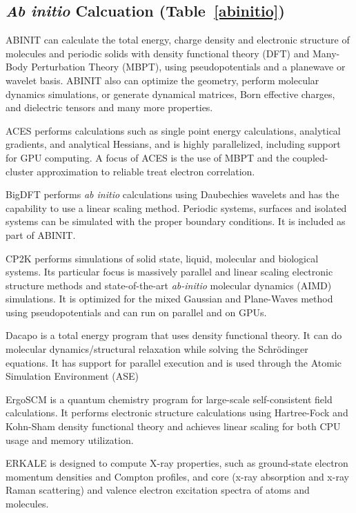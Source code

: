 \subsection*{\textit{Ab initio} Calcuation (Table~\ref{abinitio})}

ABINIT \cite{Gonze_2009} can calculate the total energy, charge density and electronic structure of molecules and periodic solids with density functional theory (DFT) and Many-Body Perturbation Theory (MBPT), using pseudopotentials and a planewave or wavelet basis. ABINIT also can optimize the geometry, perform molecular dynamics simulations, or generate dynamical matrices, Born effective charges, and dielectric tensors and many more properties. 

ACES \cite{Lotrich_2008} performs calculations such as single point energy calculations, analytical gradients, and analytical Hessians, and is highly parallelized, including support for GPU computing.
A focus of ACES is the use of MBPT and the coupled-cluster approximation to reliable treat electron correlation.

BigDFT \cite{Genovese_2008,Mohr_2014,Mohr_2015} performs \textit{ab initio} calculations using Daubechies wavelets and has the capability to use a linear scaling method.  Periodic systems, surfaces and isolated systems can be simulated with the proper boundary conditions. It is included as part of ABINIT.

CP2K \cite{Hutter_2013} performs simulations of solid state, liquid, molecular and biological systems. Its particular focus is massively parallel and linear scaling electronic structure methods and state-of-the-art \textit{ab-initio} molecular dynamics (AIMD) simulations. It is optimized for the mixed Gaussian and Plane-Waves method using pseudopotentials and can run on parallel and on GPUs.

Dacapo is a total energy program that uses density functional theory. It can do molecular dynamics/structural relaxation while solving the Schr\"odinger equations. It has support for parallel execution and is used through the Atomic Simulation Environment (ASE) \cite{Bahn_2002}

ErgoSCM \cite{Rudberg_2011} is a quantum chemistry program for large-scale self-consistent field calculations. It performs electronic structure calculations using Hartree-Fock and Kohn-Sham density functional theory and achieves linear scaling for both CPU usage and memory utilization.

ERKALE \cite{Lehtola_2012} is designed to compute X-ray properties, such as ground-state electron momentum densities and Compton profiles, and core (x-ray absorption and x-ray Raman scattering) and valence electron excitation spectra of atoms and molecules.

